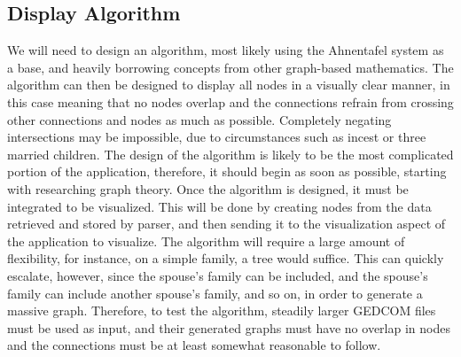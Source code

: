 \documentclass[onecolumn, draftclsnofoot, 10pt, compsoc]{IEEEtran}
\begin{document}
\subsection{Display Algorithm}
\begin{singlespace}
We will need to design an algorithm, most likely using the Ahnentafel system as a base, and heavily borrowing concepts from other graph-based mathematics. The algorithm can then be designed to display all nodes in a visually clear manner, in this case meaning that no nodes overlap and the connections refrain from crossing other connections and nodes as much as possible. Completely negating intersections may be impossible, due to circumstances such as incest or three married children.
\newline
\newline
The design of the algorithm is likely to be the most complicated portion of the application, therefore, it should begin as soon as possible, starting with researching graph theory.
\newline
\newline
Once the algorithm is designed, it must be integrated to be visualized. This will be done by creating nodes from the data retrieved and stored by parser, and then sending it to the visualization aspect of the application to visualize.
\newline
\newline
The algorithm will require a large amount of flexibility, for instance, on a simple family, a tree would suffice. This can quickly escalate, however, since the spouse’s family can be included, and the spouse’s family can include another spouse’s family, and so on, in order to generate a massive graph. Therefore, to test the algorithm, steadily larger GEDCOM files must be used as input, and their generated graphs must have no overlap in nodes and the connections must be at least somewhat reasonable to follow.

\end{singlespace}
\end{document}
